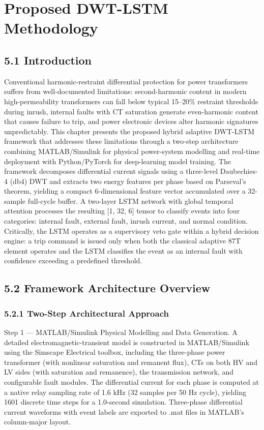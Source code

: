 \chapter{Proposed DWT-LSTM Methodology}
\label{ch:chapter5}


\section{5.1  Introduction}
Conventional harmonic-restraint differential protection for power transformers \cite{ref4} suffers from well-documented limitations: second-harmonic content in modern high-permeability transformers can fall below typical 15--20\% restraint thresholds during inrush, internal faults with CT saturation generate even-harmonic content that causes failure to trip, and power electronic devices alter harmonic signatures unpredictably. This chapter presents the proposed hybrid adaptive DWT-LSTM framework \cite{ref1, ref2} that addresses these limitations through a two-step architecture combining MATLAB/Simulink for physical power-system modelling and real-time deployment with Python/PyTorch for deep-learning model training. The framework decomposes differential current signals using a three-level Daubechies-4 (db4) DWT and extracts two energy features per phase based on Parseval's theorem, yielding a compact 6-dimensional feature vector accumulated over a 32-sample full-cycle buffer. A two-layer LSTM network with global temporal attention processes the resulting [1, 32, 6] tensor to classify events into four categories: internal fault, external fault, inrush current, and normal condition. Critically, the LSTM operates as a supervisory veto gate within a hybrid decision engine: a trip command is issued only when both the classical adaptive 87T element operates and the LSTM classifies the event as an internal fault with confidence exceeding a predefined threshold.


\section{5.2  Framework Architecture Overview}

\subsection{5.2.1  Two-Step Architectural Approach}
Step 1 --- MATLAB/Simulink Physical Modelling and Data Generation. A detailed electromagnetic-transient model is constructed in MATLAB/Simulink using the Simscape Electrical toolbox, including the three-phase power transformer (with nonlinear saturation and remanent flux), CTs on both HV and LV sides (with saturation and remanence), the transmission network, and configurable fault modules. The differential current for each phase is computed at a native relay sampling rate of 1.6 kHz (32 samples per 50 Hz cycle), yielding 1601 discrete time steps for a 1.0-second simulation. Three-phase differential current waveforms with event labels are exported to .mat files in MATLAB's column-major layout.

